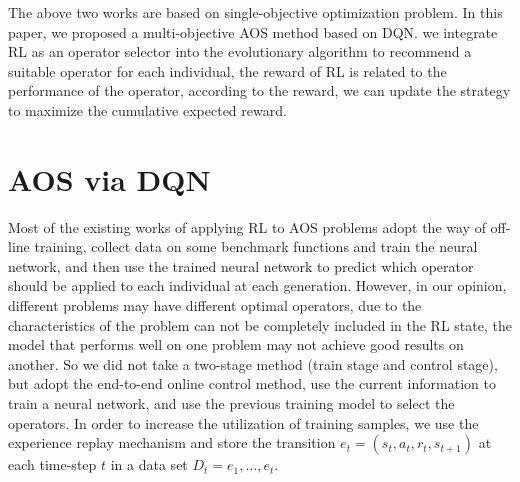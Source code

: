 \documentclass[journal]{IEEEtran}
\begin{document}
The above two works are based on single-objective optimization problem. In this paper, we proposed a multi-objective AOS method based on DQN.
we integrate RL as an operator selector into the evolutionary algorithm to recommend a suitable operator for each individual, the reward of RL is related to the performance of the operator, according to the reward, we can update the strategy to maximize the cumulative expected reward.


\section{AOS via DQN}
Most of the existing works of applying RL to AOS problems adopt the way of off-line training, collect data on some benchmark functions and train the neural network, and then use the trained neural network to predict which operator should be applied to each individual at each generation.
% 
However, in our opinion, different problems may have different optimal operators, due to the characteristics of the problem can not be completely included in the RL state, the model that performs well on one problem may not achieve good results on another.
So we did not take a two-stage method (train stage and control stage), but adopt the end-to-end online control method, use the current information to train a neural network, and use the previous training model to select the operators.
In order to increase the utilization of training samples, we use the experience replay mechanism \cite{zha2019experience} and store the transition $e_t = (s_t,a_t,r_t,s_{t+1})$ at each time-step $t$ in a data set $D_t = {e_1,\dots, e_t}$.
\end{document}
